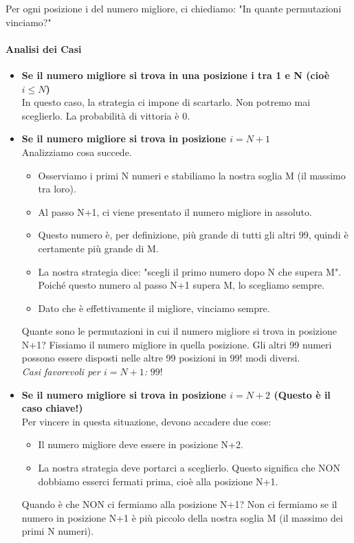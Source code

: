 Per ogni posizione i del numero migliore, ci chiediamo: "In quante permutazioni vinciamo?"

\paragraph{Analisi dei Casi}
\begin{itemize}
    \item \textbf{Se il numero migliore si trova in una posizione i tra 1 e N (cioè $i \le N$)} \\
    In questo caso, la strategia ci impone di scartarlo. Non potremo mai sceglierlo. La probabilità di vittoria è 0.

    \item \textbf{Se il numero migliore si trova in posizione $i = N+1$} \\
    Analizziamo cosa succede.
    \begin{itemize}
        \item Osserviamo i primi N numeri e stabiliamo la nostra soglia M (il massimo tra loro).
        \item Al passo N+1, ci viene presentato il numero migliore in assoluto.
        \item Questo numero è, per definizione, più grande di tutti gli altri 99, quindi è certamente più grande di M.
        \item La nostra strategia dice: "scegli il primo numero dopo N che supera M". Poiché questo numero al passo N+1 supera M, lo scegliamo sempre.
        \item Dato che è effettivamente il migliore, vinciamo sempre.
    \end{itemize}
    Quante sono le permutazioni in cui il numero migliore si trova in posizione N+1? Fissiamo il numero migliore in quella posizione. Gli altri 99 numeri possono essere disposti nelle altre 99 posizioni in $99!$ modi diversi. \\
    \textit{Casi favorevoli per $i = N+1$:} $99!$

    \item \textbf{Se il numero migliore si trova in posizione $i = N+2$ (Questo è il caso chiave!)} \\
    Per vincere in questa situazione, devono accadere due cose:
    \begin{itemize}
        \item Il numero migliore deve essere in posizione N+2.
        \item La nostra strategia deve portarci a sceglierlo. Questo significa che NON dobbiamo esserci fermati prima, cioè alla posizione N+1.
    \end{itemize}
    Quando è che NON ci fermiamo alla posizione N+1? Non ci fermiamo se il numero in posizione N+1 è più piccolo della nostra soglia M (il massimo dei primi N numeri).
    

\end{itemize}
